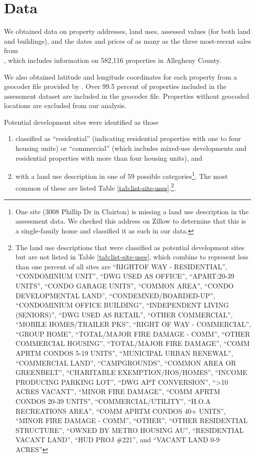 \documentclass[
]{book}
\providecommand{\tightlist}{%
  \setlength{\itemsep}{0pt}\setlength{\parskip}{0pt}}
\begin{document}
\hypertarget{data}{%
\section{Data}\label{data}}

We obtained data on property addresses, land uses, assessed values (for both
land and buildings), and the dates and prices of as many as the three
most-recent sales from\\
\citet{allegheny_county_office_of_property_assessments_allegheny_2022}, which
includes information on 582,116 properties in Allegheny County.

We also obtained latitude and longitude coordinates for each property from a
geocoder file provided by \citet{western_pennsylvania_regional_data_center_geocoders_2021}.
Over 99.5 percent of properties included in the assessment dataset are included
in the geocoder file. Properties without geocoded locations are excluded from
our analysis.

Potential development sites were identified as those

\begin{enumerate}
\def\labelenumi{\arabic{enumi}.}
\tightlist
\item
  classified as ``residential''
  (indicating residential properties with one to four housing units) or ``commercial''
  (which includes mixed-use developments and residential properties with more than four
  housing units), and
\item
  with a land use description in one of 59 possible categories\footnote{One site (3008 Phillip Dr in Clairton) is missing a land use description in the assessment data. We checked this address on Zillow to determine that this is a single-family home and classified it as such in our data.}. The most common of
  these are listed Table \ref{tab:list-site-uses}.\footnote{The land use descriptions that were
    classified as potential development sites but are not listed in Table
    \ref{tab:list-site-uses}, which combine to represent less than one percent of all sites
    are ``RIGHTOF WAY - RESIDENTIAL'', ``CONDOMINIUM UNIT'', ``DWG USED AS OFFICE'',
    ``APART:20-39 UNITS'', ``CONDO GARAGE UNITS'', ``COMMON AREA'', ``CONDO DEVELOPMENTAL
    LAND'', ``CONDEMNED/BOARDED-UP'', ``CONDOMINIUM OFFICE BUILDING'', ``INDEPENDENT LIVING
    (SENIORS)'', ``DWG USED AS RETAIL'', ``OTHER COMMERCIAL'', ``MOBILE HOMES/TRAILER PKS'',
    ``RIGHT OF WAY - COMMERCIAL'', ``GROUP HOME'', ``TOTAL/MAJOR FIRE DAMAGE - COMM'',
    ``OTHER COMMERCIAL HOUSING'', ``TOTAL/MAJOR FIRE DAMAGE'', ``COMM APRTM CONDOS 5-19
    UNITS'', ``MUNICIPAL URBAN RENEWAL'', ``COMMERCIAL LAND'', ``CAMPGROUNDS'', ``COMMON AREA
    OR GREENBELT'', ``CHARITABLE EXEMPTION/HOS/HOMES'', ``INCOME PRODUCING PARKING LOT'',
    ``DWG APT CONVERSION'', ``\textgreater10 ACRES VACANT'', ``MINOR FIRE DAMAGE'', ``COMM APRTM CONDOS
    20-39 UNITS'', ``COMMERCIAL/UTILITY'',
    ``H.O.A RECREATIONS AREA'', ``COMM APRTM CONDOS 40+ UNITS'', ``MINOR FIRE DAMAGE - COMM'',
    ``OTHER'', ``OTHER RESIDENTIAL STRUCTURE'', ``OWNED BY METRO HOUSING AU'', ``RESIDENTIAL VACANT
    LAND'', ``HUD PROJ \#221'', and ``VACANT LAND 0-9 ACRES''}.
\end{enumerate}
\end{document}
